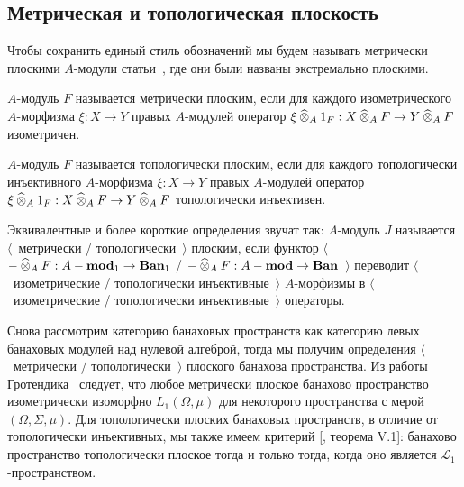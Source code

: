 
\subsection{
    Метрическая и топологическая плоскость
}\label{
    SubSectionMetricAndTopologicalFlatness
}

Чтобы сохранить единый стиль обозначений мы будем называть метрически плоскими
$A$-модули статьи~\cite{HelMetrFlatNorMod}, где они были названы экстремально
плоскими.

\begin{definition}\label{MetFlatMod} $A$-модуль $F$
называется метрически плоским, если для каждого изометрического $A$-морфизма
$\xi:X\to Y$ правых $A$-модулей оператор $\xi\mathbin{\widehat{\otimes}}_{A}
1_F:X\mathbin{\widehat{\otimes}}_{A} F\to Y\mathbin{\widehat{\otimes}}_{A} F$ изометричен.
\end{definition}

\begin{definition}\label{TopFlatMod}
$A$-модуль $F$ называется топологически плоским, если для каждого топологически
инъективного $A$-морфизма $\xi:X\to Y$ правых $A$-модулей оператор
$\xi\mathbin{\widehat{\otimes}}_{A} 1_F:X\mathbin{\widehat{\otimes}}_{A} F\to Y\mathbin{\widehat{\otimes}}_{A} F$ топологически
инъективен.
\end{definition}

Эквивалентные и более короткие определения звучат так: $A$-модуль $J$ называется
$\langle$~метрически / топологически~$\rangle$ плоским, если функтор
$\langle$~$-\mathbin{\widehat{\otimes}}_{A} F:A-\mathbf{mod}_1\to\mathbf{Ban}_1$ /
$-\mathbin{\widehat{\otimes}}_{A} F:A-\mathbf{mod}\to\mathbf{Ban}$~$\rangle$ переводит
$\langle$~изометрические / топологически инъективные~$\rangle$ $A$-морфизмы в
$\langle$~изометрические / топологически инъективные~$\rangle$ операторы.

Снова рассмотрим категорию банаховых пространств как категорию левых банаховых
модулей над нулевой алгеброй, тогда мы получим определения $\langle$~метрически
/ топологически~$\rangle$ плоского банахова пространства. Из работы
Гротендика~\cite{GrothMetrProjFlatBanSp} следует, что любое метрически плоское
банахово пространство изометрически изоморфно $L_1(\Omega,\mu)$ для некоторого
пространства с мерой $(\Omega,\Sigma,\mu)$. Для топологически плоских банаховых
пространств, в отличие от топологически инъективных, мы также имеем критерий
[\cite{StegRethNucOpL1LInfSp}, теорема V.1]: банахово пространство топологически
плоское тогда и только тогда, когда оно является $\mathscr{L}_1$-пространством.

